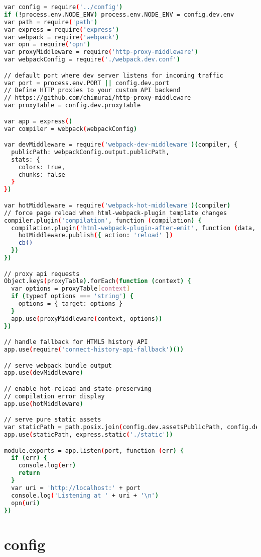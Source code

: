 \begin{lstlisting}[language=bash]
var config = require('../config')
if (!process.env.NODE_ENV) process.env.NODE_ENV = config.dev.env
var path = require('path')
var express = require('express')
var webpack = require('webpack')
var opn = require('opn')
var proxyMiddleware = require('http-proxy-middleware')
var webpackConfig = require('./webpack.dev.conf')

// default port where dev server listens for incoming traffic
var port = process.env.PORT || config.dev.port
// Define HTTP proxies to your custom API backend
// https://github.com/chimurai/http-proxy-middleware
var proxyTable = config.dev.proxyTable

var app = express()
var compiler = webpack(webpackConfig)

var devMiddleware = require('webpack-dev-middleware')(compiler, {
  publicPath: webpackConfig.output.publicPath,
  stats: {
    colors: true,
    chunks: false
  }
})

var hotMiddleware = require('webpack-hot-middleware')(compiler)
// force page reload when html-webpack-plugin template changes
compiler.plugin('compilation', function (compilation) {
  compilation.plugin('html-webpack-plugin-after-emit', function (data, cb) {
    hotMiddleware.publish({ action: 'reload' })
    cb()
  })
})

// proxy api requests
Object.keys(proxyTable).forEach(function (context) {
  var options = proxyTable[context]
  if (typeof options === 'string') {
    options = { target: options }
  }
  app.use(proxyMiddleware(context, options))
})

// handle fallback for HTML5 history API
app.use(require('connect-history-api-fallback')())

// serve webpack bundle output
app.use(devMiddleware)

// enable hot-reload and state-preserving
// compilation error display
app.use(hotMiddleware)

// serve pure static assets
var staticPath = path.posix.join(config.dev.assetsPublicPath, config.dev.assetsSubDirectory)
app.use(staticPath, express.static('./static'))

module.exports = app.listen(port, function (err) {
  if (err) {
    console.log(err)
    return
  }
  var uri = 'http://localhost:' + port
  console.log('Listening at ' + uri + '\n')
  opn(uri)
})
\end{lstlisting}

\section{config}

